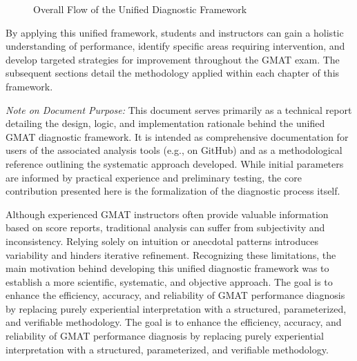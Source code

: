 \documentclass{article}
\begin{document}
\begin{figure}[htbp]
{} %

\vspace{\baselineskip}

\caption{Overall Flow of the Unified Diagnostic Framework}
\label{fig:framework_flow}

\end{figure}


By applying this unified framework, students and instructors can gain a holistic understanding of performance, identify specific areas requiring intervention, and develop targeted strategies for improvement throughout the GMAT exam. The subsequent sections detail the methodology applied within each chapter of this framework.

\textit{Note on Document Purpose:} This document serves primarily as a technical report detailing the design, logic, and implementation rationale behind the unified GMAT diagnostic framework. It is intended as comprehensive documentation for users of the associated analysis tools (e.g., on GitHub) and as a methodological reference outlining the systematic approach developed. While initial parameters are informed by practical experience and preliminary testing, the core contribution presented here is the formalization of the diagnostic process itself.

Although experienced GMAT instructors often provide valuable information based on score reports, traditional analysis can suffer from subjectivity and inconsistency. Relying solely on intuition or anecdotal patterns introduces variability and hinders iterative refinement. Recognizing these limitations, the main motivation behind developing this unified diagnostic framework was to establish a more scientific, systematic, and objective approach. The goal is to enhance the efficiency, accuracy, and reliability of GMAT performance diagnosis by replacing purely experiential interpretation with a structured, parameterized, and verifiable methodology. The goal is to enhance the efficiency, accuracy, and reliability of GMAT performance diagnosis by replacing purely experiential interpretation with a structured, parameterized, and verifiable methodology.
\end{document}
